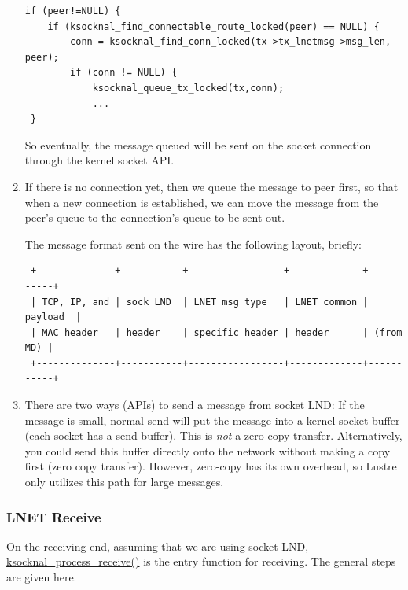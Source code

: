 \begin{enumerate}
\begin{Verbatim}
if (peer!=NULL) {
    if (ksocknal_find_connectable_route_locked(peer) == NULL) {
        conn = ksocknal_find_conn_locked(tx->tx_lnetmsg->msg_len, peer);
        if (conn != NULL) {
            ksocknal_queue_tx_locked(tx,conn);
            ...
 }
\end{Verbatim}

So eventually, the message queued will be sent on the socket connection
through the kernel socket API. 

\item If there is no connection yet, then we queue the message to peer first,
so that when a new connection is established, we can move the message from the 
peer's queue to the connection's queue to be sent out.

The message format sent on the wire has the following layout, briefly:

\begin{Verbatim}
 +--------------+-----------+-----------------+-------------+-----------+
 | TCP, IP, and | sock LND  | LNET msg type   | LNET common |  payload  |
 | MAC header   | header    | specific header | header      | (from MD) |
 +--------------+-----------+-----------------+-------------+-----------+
\end{Verbatim}

\item There are two ways (APIs) to send a message from socket LND: If the
message is small, normal send will put the message into a kernel socket
buffer (each socket has a send buffer). This is \textit{not} a zero-copy
transfer.  Alternatively, you could send this buffer directly onto the network
without making a copy first (zero copy transfer). However, zero-copy has its
own overhead, so Lustre only utilizes this path for large messages.

\end{enumerate}


\subsubsection{LNET Receive}

On the receiving end, assuming that we are using socket LND, 
\url{ksocknal_process_receive()} is the entry function for receiving. The
general steps are given here.

